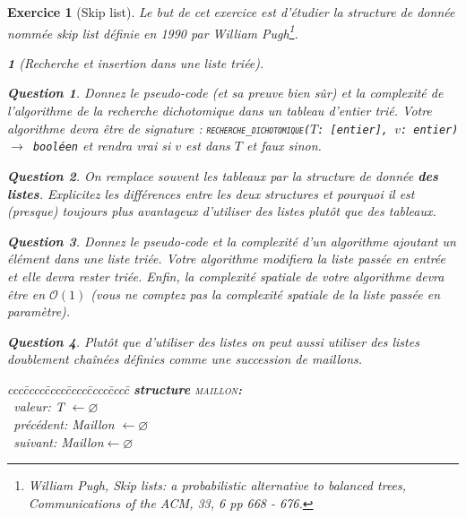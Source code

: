 \documentclass{article}
\theoremstyle{exostyle}
\newtheorem{exo}{Exercice}
\theoremstyle{partiestyle}
\newtheorem{partie}{}[exo]
\theoremstyle{questionstyle}
\newtheorem{questionpartie}{Question}[partie]
\begin{document}
\begin{exo}[Skip list]
    Le but de cet exercice est d'étudier la structure de donnée nommée \textit{skip list} définie en 1990 par  William Pugh\footnote{William Pugh, \textit{Skip lists: a probabilistic alternative to balanced trees}, Communications of the ACM, 33, 6 pp 668 - 676.}.
    \begin{partie}[Recherche et insertion dans une liste triée]
        ~\vspace*{-.5cm}
        \begin{questionpartie}
            Donnez le pseudo-code (et sa preuve bien sûr) et la complexité de l'algorithme de la recherche dichotomique dans un tableau d'entier trié. Votre algorithme devra être de signature : \texttt{\textsc{recherche\_dichotomique}($T$: [entier], $v$: entier) $\rightarrow$ booléen} et rendra vrai si $v$ est dans $T$ et faux sinon.
        \end{questionpartie}
        \begin{questionpartie}
            On remplace souvent les tableaux par la  structure de donnée \textbf{des listes}. Explicitez les différences entre les deux structures et pourquoi il est (presque) toujours plus avantageux d'utiliser des listes plutôt que des tableaux.
        \end{questionpartie}
        \begin{questionpartie}
            Donnez le pseudo-code et la complexité d'un algorithme ajoutant un élément dans une liste triée. Votre algorithme modifiera la liste passée en entrée et elle devra rester triée. Enfin,  la complexité spatiale de votre algorithme devra être en $\mathcal{O}(1)$ (vous ne comptez pas la complexité spatiale de la liste passée en paramètre).
        \end{questionpartie}
        \begin{questionpartie}
            Plutôt que d'utiliser des listes on peut aussi utiliser des listes doublement chaînées définies comme une succession de maillons.
            \label{struct-maillon}
            \begin{tabbing}
                ccc\=cccc\=cccc\=cccc\=cccc\=cccc\=\kill
                \textbf{structure} \textsc{maillon}{\bf :}\\
                \>\vline$\,$   valeur: T $\leftarrow \varnothing$\\
                \>\vline$\,$ précédent: Maillon $\leftarrow \varnothing$\\
                \>\vline$\,$ suivant: Maillon$\leftarrow \varnothing$\\

\end{tabbing}
\end{questionpartie}
\end{partie}
\end{exo}
\end{document}
